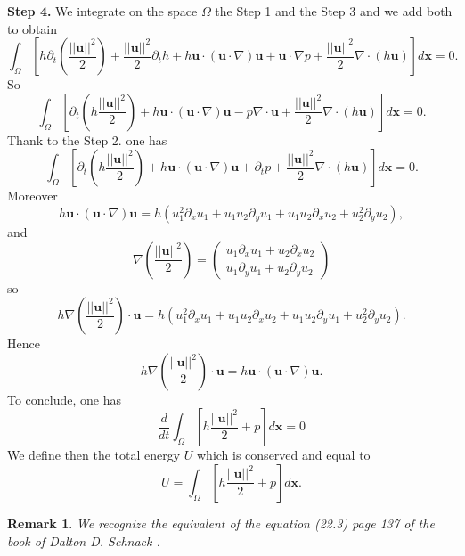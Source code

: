 \documentclass[a4paper, 11pt]{report}
\newtheorem{Remark}{Remark}
\begin{document}
\textbf{Step 4.}
We integrate on the space $\Omega$ the Step 1 and the Step 3 and we add both to obtain
\begin{equation*}
\int_{\Omega}\left[h\partial_t\left(\frac{||\boldsymbol{u}||^2}{2}\right)+\frac{||\boldsymbol{u}||^2}{2}\partial_t h+h\boldsymbol{u}\cdot \left(\boldsymbol{u}\cdot \nabla\right)\boldsymbol{u}+\boldsymbol{u}\cdot \nabla p+\frac{||\boldsymbol{u}||^2}{2}\nabla \cdot \left(h\boldsymbol{u}\right) \right]d\boldsymbol{x}=0.
\end{equation*}
So 
\begin{equation*}
\int_{\Omega}\left[\partial_t \left(h\frac{||\boldsymbol{u}||^2}{2}\right)+h\boldsymbol{u}\cdot \left(\boldsymbol{u}\cdot \nabla\right)\boldsymbol{u}-p\nabla \cdot \boldsymbol{u}+\frac{||\boldsymbol{u}||^2}{2}\nabla \cdot \left(h\boldsymbol{u}\right) \right]d\boldsymbol{x}=0.
\end{equation*}
Thank to the Step 2. one has
\begin{equation*}
\int_{\Omega}\left[\partial_t \left(h\frac{||\boldsymbol{u}||^2}{2}\right)+h\boldsymbol{u}\cdot \left(\boldsymbol{u}\cdot \nabla\right)\boldsymbol{u}+\partial_t p+\frac{||\boldsymbol{u}||^2}{2}\nabla \cdot \left(h\boldsymbol{u}\right) \right]d\boldsymbol{x}=0.
\end{equation*}
Moreover
\begin{equation*}
h\boldsymbol{u}\cdot \left(\boldsymbol{u}\cdot \nabla\right)\boldsymbol{u}=h\left(u_1^2\partial_x u_1+u_1u_2\partial_yu_1+u_1u_2\partial_x u_2+u_2^2\partial_yu_2\right),
\end{equation*}
and 
\begin{equation*}
\nabla \left(\frac{||\boldsymbol{u}||^2}{2}\right)=\begin{pmatrix}u_1\partial_x u_1+u_2\partial_xu_2\\u_1\partial_yu_1+u_2\partial_yu_2\end{pmatrix}
\end{equation*}
so
\begin{equation*}
h\nabla \left(\frac{||\boldsymbol{u}||^2}{2}\right)\cdot \boldsymbol{u}=h\left(u_1^2\partial_xu_1+u_1u_2\partial_x u_2+u_1u_2\partial_yu_1+u_2^2\partial_yu_2\right).
\end{equation*}
Hence \begin{equation*}
h\nabla \left(\frac{||\boldsymbol{u}||^2}{2}\right)\cdot \boldsymbol{u}=h\boldsymbol{u}\cdot \left(\boldsymbol{u}\cdot \nabla\right)\boldsymbol{u}.
\end{equation*}
To conclude, one has
\begin{equation*}
\frac{d}{dt}\int_{\Omega}\left[h\frac{||\boldsymbol{u}||^2}{2}+p\right]d\boldsymbol{x}=0
\end{equation*}
We define then the total energy $U$ which is conserved and equal to
\begin{equation*}
U=\int_{\Omega}\left[h\frac{||\boldsymbol{u}||^2}{2}+p\right]d\boldsymbol{x}.
\end{equation*}
\begin{Remark} We recognize the equivalent of the equation (22.3) page 137 of the book of Dalton D. Schnack \cite{Schnack_2009}.
\end{Remark}


\end{document}
